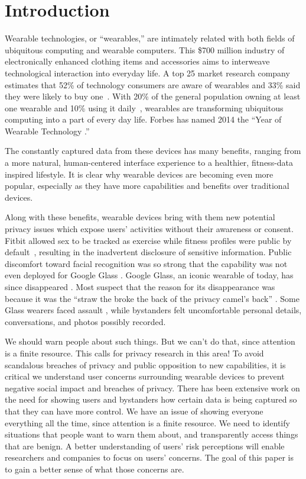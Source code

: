 
\section{Introduction}

Wearable technologies, or ``wearables,'' are intimately related with both fields of ubiquitous computing and wearable computers. This \$700 million industry \cite{cmo} of electronically enhanced clothing items and accessories aims to interweave technological interaction into everyday life. A top 25 market research company estimates that 52\% of technology consumers are aware of wearables and 33\% said they were likely to buy one~\cite{NPD}. With 20\% of the general population owning at least one wearable and 10\% using it daily~\cite{WearableStatNews}, wearables are transforming ubiquitous computing into a part of every day life. Forbes has named 2014 the ``Year of Wearable Technology \cite{Forbes}.''

The constantly captured data from these devices has many benefits, ranging from a more natural, human-centered interface experience to a healthier, fitness-data inspired lifestyle. It is clear why wearable devices are becoming even more popular, especially as they have more capabilities and benefits over traditional devices. 

Along with these benefits, wearable devices bring with them new potential privacy issues which expose users' activities without their awareness or consent. Fitbit allowed sex to be tracked as exercise while fitness profiles were public by default~\cite{Fitbit}, resulting in the inadvertent disclosure of sensitive information. Public discomfort toward facial recognition was so strong that the capability was not even deployed for Google Glass \cite{GlassDetection}. Google Glass, an iconic wearable of today, has since disappeared \cite{13_google_2015}. Most suspect that the reason for its disappearance was because it was the ``straw the broke the back of the privacy camel's back'' \cite{14_dvorak_2014}. Some Glass wearers faced assault \cite{1_russell_2014, 15_mashable_2014, 16_gross_2014}, while bystanders felt uncomfortable personal details, conversations, and photos possibly recorded.

{\color {red} We should warn people about such things. But we can't do that, since attention is a finite resource. This calls for privacy research in this area!}  To avoid scandalous breaches of privacy and public opposition to new capabilities, it is critical we understand user concerns surrounding wearable devices to prevent negative social impact and breaches of privacy. There has been extensive work on the need for showing users and bystanders how certain data is being captured so that they can have more control. We have an issue of showing everyone everything all the time, since attention is a finite resource. We need to identify situations that people want to warn them about, and transparently access things that are benign. A better understanding of users' risk perceptions will enable researchers and companies to focus on users' concerns. The goal of this paper is to gain a better sense of what those concerns are. 

